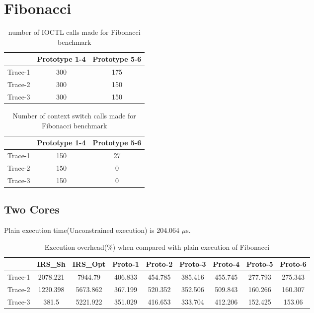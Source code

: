\newpage

\section{Fibonacci}

\begin{table}[h]
\begin{center}
 \begin{tabular}{|c c c|} 
 \hline
 & Prototype 1-4 & Prototype 5-6\\ %
 \hline
 Trace-1 & 300 & 175\\ 
 Trace-2 & 300 & 150\\
 Trace-3 & 300 & 150\\
 \hline
\end{tabular}
\end{center}
\caption{number of IOCTL calls made for Fibonacci benchmark}
\label{fibonacci_num_ioctls}
\end{table}
\begin{table}[h]
\begin{center}
 \begin{tabular}{|c c c|} 
 \hline
 & Prototype 1-4 & Prototype 5-6\\ %
 \hline
 Trace-1 & 150 & 27\\ 
 Trace-2 & 150 & 0\\
 Trace-3 & 150 & 0\\
 \hline
\end{tabular}
\end{center}
\caption{Number of context switch calls made for Fibonacci benchmark}
\label{fibonacci_num_ctxts}
\end{table}

\subsection{Two Cores}
Plain execution time(Unconstrained execution) is 204.064 $\mu$s.
\begin{table}[h]
\begin{center}
 \begin{tabular}{|c c c c c c c c c|} 
 \hline
 & IRS\_Sh & IRS\_Opt& Proto-1 & Proto-2 & Proto-3 & Proto-4 & Proto-5 & Proto-6\\ %
 \hline
Trace-1 & 2078.221 & 7944.79 & 406.833 & 454.785 & 385.416 & 455.745 & 277.793 & 275.343\\
Trace-2 & 1220.398 & 5673.862 & 367.199 & 520.352 & 352.506 & 509.843 & 160.266 & 160.307\\
Trace-3 & 381.5 & 5221.922 & 351.029 & 416.653 & 333.704 & 412.206 & 152.425 & 153.06\\
\hline
\end{tabular}
\end{center}
\caption{Execution overhead(\%) when compared with plain execution of Fibonacci}
\label{fibonacci_irs_res_cores_2}
\end{table}

